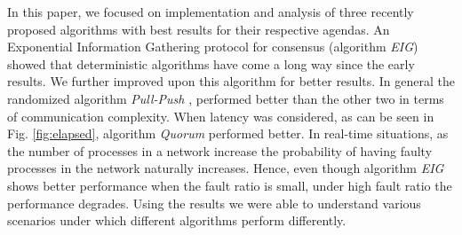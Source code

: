 In this paper, we focused on implementation and analysis of three recently proposed algorithms with best results for their respective agendas. An Exponential Information Gathering protocol for consensus \cite{KM13} (algorithm \textit{EIG}) showed that deterministic algorithms have come a long way since the early results. We further improved upon this algorithm for better results. In general the randomized algorithm \textit{Pull-Push} \cite{BGH13}, performed better than the other two in terms of communication complexity. When latency was considered, as can be seen in Fig. \ref{fig:elapsed}, algorithm \textit{Quorum} \cite{BPV06} performed better. In real-time situations, as the number of processes in a network increase the probability of having faulty processes in the network naturally increases. Hence, even though algorithm \textit{EIG} shows better performance when the fault ratio is small, under high fault ratio the performance degrades. Using the results we were able to understand various scenarios under which different algorithms perform differently.
